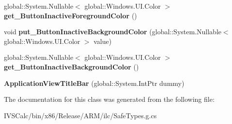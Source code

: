 \begin{DoxyCompactItemize}
global\+::\+System.\+Nullable$<$ global\+::\+Windows.\+U\+I.\+Color $>$ {\bfseries get\+\_\+\+Button\+Inactive\+Foreground\+Color} ()
\item 
\mbox{\label{class_windows_1_1_u_i_1_1_view_management_1_1_application_view_title_bar_a61074bacb31ca090b2114fcd7d61167b}} 
void {\bfseries put\+\_\+\+Button\+Inactive\+Background\+Color} (global\+::\+System.\+Nullable$<$ global\+::\+Windows.\+U\+I.\+Color $>$ value)
\item 
\mbox{\label{class_windows_1_1_u_i_1_1_view_management_1_1_application_view_title_bar_abafef7d0cebc7bdecdff70332dd6c825}} 
global\+::\+System.\+Nullable$<$ global\+::\+Windows.\+U\+I.\+Color $>$ {\bfseries get\+\_\+\+Button\+Inactive\+Background\+Color} ()
\item 
\mbox{\label{class_windows_1_1_u_i_1_1_view_management_1_1_application_view_title_bar_a4b9382135e40d19c25f0633e1eea3e67}} 
{\bfseries Application\+View\+Title\+Bar} (global\+::\+System.\+Int\+Ptr dummy)
\end{DoxyCompactItemize}


The documentation for this class was generated from the following file\+:\begin{DoxyCompactItemize}
\item 
I\+V\+S\+Calc/bin/x86/\+Release/\+A\+R\+M/ilc/Safe\+Types.\+g.\+cs\end{DoxyCompactItemize}
